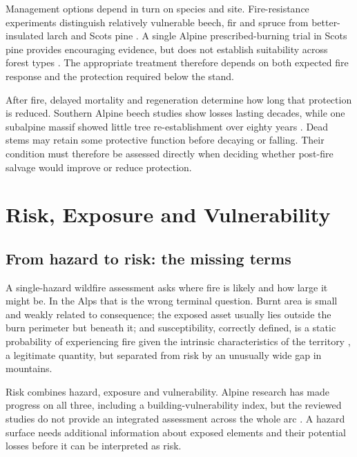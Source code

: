 \documentclass[11pt,a4paper]{article}
\begin{document}
Management options depend in turn on species and site. Fire-resistance experiments distinguish relatively vulnerable beech, fir and spruce from better-insulated larch and Scots pine \citep{mutterer_bark_2026}. A single Alpine prescribed-burning trial in Scots pine provides encouraging evidence, but does not establish suitability across forest types \citep{gamba_prescribed_2025}. The appropriate treatment therefore depends on both expected fire response and the protection required below the stand.

After fire, delayed mortality and regeneration determine how long that protection is reduced. Southern Alpine beech studies show losses lasting decades, while one subalpine massif showed little tree re-establishment over eighty years \citep{maringer_temporal_2016, gehring_shallow_2019, degiuli_arrested_2024}. Dead stems may retain some protective function before decaying or falling. Their condition must therefore be assessed directly when deciding whether post-fire salvage would improve or reduce protection.

\section{Risk, Exposure and Vulnerability}
\label{sec:risk}

\subsection{From hazard to risk: the missing terms}

A single-hazard wildfire assessment asks where fire is likely and how large it might be. In the Alps that is the wrong terminal question. Burnt area is small and weakly related to consequence; the exposed asset usually lies outside the burn perimeter but beneath it; and susceptibility, correctly defined, is a static probability of experiencing fire given the intrinsic characteristics of the territory \citep{trucchia_defining_2022}, a legitimate quantity, but separated from risk by an unusually wide gap in mountains.

Risk combines hazard, exposure and vulnerability. Alpine research has made progress on all three, including a building-vulnerability index, but the reviewed studies do not provide an integrated assessment across the whole arc \citep{gerberding_mapping_2025, papathomakohle_towards_2025}. A hazard surface needs additional information about exposed elements and their potential losses before it can be interpreted as risk.
\end{document}
